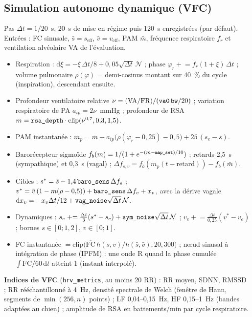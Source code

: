 \documentclass[10pt,a4paper]{article}
\newcommand{\cmd}[1]{\texttt{#1}}
\newcommand{\vp}[1]{\text{\texttt{\detokenize{#1}}}}
\newcommand{\dd}{\mathrm{d}}
\begin{document}
\subsection{Simulation autonome dynamique (VFC)}
Pas $\Delta t = 1/20$~s, 20~s de mise en régime puis 120~s enregistrées (par défaut). Entrées : FC sinusale, $\bar s = s_\text{eff}$, $\bar v = v_\text{eff}$, PAM $\bar m$, fréquence respiratoire $f_r$ et ventilation alvéolaire VA de l'évaluation.
\begin{itemize}
\item Respiration : $\dd\xi = -\xi\,\Delta t/8 + 0{,}05\sqrt{\Delta t}\,\mathcal N$ ; phase $\varphi_r \mathrel{+}= f_r(1 + \xi)\,\Delta t$ ; volume pulmonaire $\rho(\varphi)$ = demi-cosinus montant sur 40~\% du cycle (inspiration), descendant ensuite.
\item Profondeur ventilatoire relative $\nu = (\text{VA}/\text{FR})/(\vp{va0}\,\vp{bw}/20)$ ; variation respiratoire de PA $a_{ip} = 2\nu$~mmHg ; profondeur de RSA $m = \vp{rsa_depth}\cdot\mathrm{clip}(\nu^{0{,}7}, 0{,}3, 1{,}5)$.
\item PAM instantanée : $m_p = \bar m - a_{ip}\bigl(\rho(\varphi_r - 0{,}25) - 0{,}5\bigr) + 25\,(s_e - \bar s)$.
\item Barorécepteur sigmoïde $f_b(m) = 1/(1 + e^{-(m - \vp{map_set})/10})$ ; retards 2,5~s (sympathique) et 0,3~s (vagal) ; $\Delta f_{s,v} = f_b(m_p(t - \text{retard})) - f_b(\bar m)$.
\item Cibles : $s^* = \bar s - 1{,}4\,\vp{baro_sens}\,\Delta f_s$ ; $v^* = \bar v\,(1 - m(\rho - 0{,}5)) + \vp{baro_sens}\,\Delta f_v + x_v$, avec la dérive vagale $\dd x_v = -x_v\Delta t/12 + \vp{vag_noise}\sqrt{\Delta t}\,\mathcal N$.
\item Dynamiques : $s_e \mathrel{+}= \frac{\Delta t}{3}(s^* - s_e) + \vp{sym_noise}\sqrt{\Delta t}\,\mathcal N$ ; $v_e \mathrel{+}= \frac{\Delta t}{0{,}25}(v^* - v_e)$ ; bornes $s \in [0; 1{,}2]$, $v \in [0; 1]$.
\item FC instantanée $= \mathrm{clip}\bigl(\overline{\text{FC}}\,h(s, v)/h(\bar s, \bar v), 20, 300\bigr)$ ; nœud sinusal à intégration de phase (IPFM) : une onde R quand la phase cumulée $\int \text{FC}/60\,\dd t$ atteint 1 (instant interpolé).
\end{itemize}
\textbf{Indices de VFC} (\cmd{hrv\_metrics}, au moins 20 RR) : RR moyen, SDNN, RMSSD ; RR rééchantillonné à 4~Hz, densité spectrale de Welch (fenêtre de Hann, segments de $\min(256, n)$ points) ; LF 0,04--0,15~Hz, HF 0,15--1~Hz (bandes adaptées au chien) ; amplitude de RSA en battements/min par cycle respiratoire.
\end{document}
